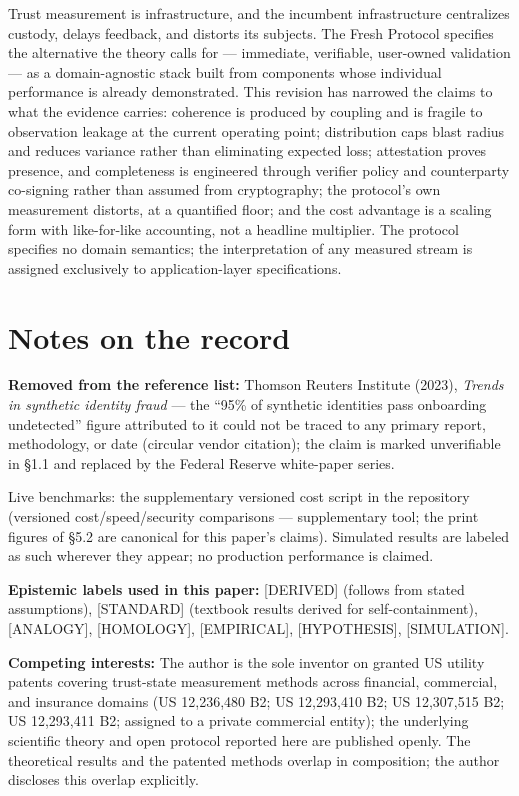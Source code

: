 \documentclass[11pt,twocolumn]{article}
\begin{document}
Trust measurement is infrastructure, and the incumbent infrastructure
centralizes custody, delays feedback, and distorts its subjects. The
Fresh Protocol specifies the alternative the theory calls for ---
immediate, verifiable, user-owned validation --- as a domain-agnostic
stack built from components whose individual performance is already
demonstrated. This revision has narrowed the claims to what the evidence
carries: coherence is produced by coupling and is fragile to observation
leakage at the current operating point; distribution caps blast radius
and reduces variance rather than eliminating expected loss; attestation
proves presence, and completeness is engineered through verifier policy
and counterparty co-signing rather than assumed from cryptography; the
protocol's own measurement distorts, at a quantified floor; and the cost
advantage is a scaling form with like-for-like accounting, not a
headline multiplier. The protocol specifies no domain semantics; the
interpretation of any measured stream is assigned exclusively to
application-layer specifications.


\FloatBarrier
\section*{Notes on the record}

\textbf{Removed from the reference list:} Thomson Reuters Institute
(2023), \emph{Trends in synthetic identity fraud} --- the ``95\% of
synthetic identities pass onboarding undetected'' figure attributed to
it could not be traced to any primary report, methodology, or date
(circular vendor citation); the claim is marked unverifiable in §1.1 and
replaced by the Federal Reserve white-paper series.

Live benchmarks:
the supplementary versioned cost script in the repository (versioned cost/speed/security comparisons ---
supplementary tool; the print figures of §5.2 are canonical for this
paper's claims). Simulated results are labeled as such wherever they
appear; no production performance is claimed.

\textbf{Epistemic labels used in this paper:} {[}DERIVED{]} (follows
from stated assumptions), {[}STANDARD{]} (textbook results derived for
self-containment), {[}ANALOGY{]}, {[}HOMOLOGY{]}, {[}EMPIRICAL{]},
{[}HYPOTHESIS{]}, {[}SIMULATION{]}.

\textbf{Competing interests:} The author is the sole inventor on granted US utility patents covering trust-state measurement methods across financial, commercial, and insurance domains (US 12,236,480 B2; US 12,293,410 B2; US 12,307,515 B2; US 12,293,411 B2; assigned to a private commercial entity); the underlying scientific theory and open protocol reported here are published openly. The theoretical results and the patented methods overlap in composition; the author discloses this overlap explicitly.
\end{document}

